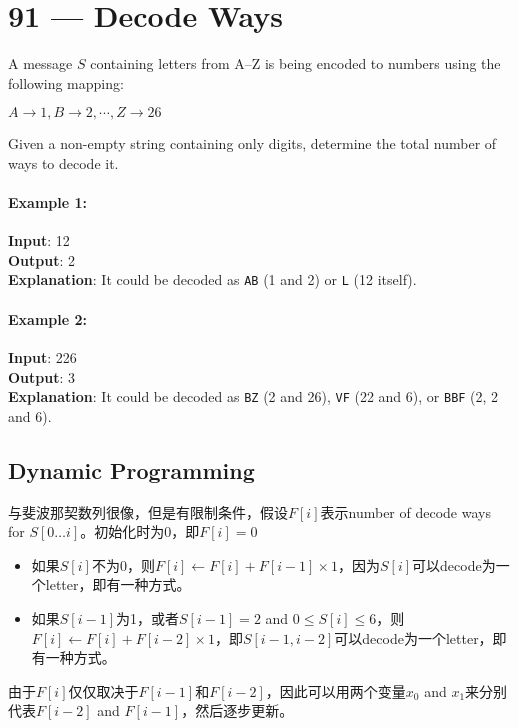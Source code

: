 \section{91 --- Decode Ways}
A message $S$ containing letters from A--Z is being encoded to numbers using the following mapping:
\par
$A\to 1, B\to 2, \cdots, Z\to 26$
\par
Given a non-empty string containing only digits, determine the total number of ways to decode it.
\paragraph{Example 1:}
\begin{flushleft}
\textbf{Input}: 12
\\
\textbf{Output}: 2
\\
\textbf{Explanation}: It could be decoded as \texttt{AB} (1 and 2) or \texttt{L} (12 itself).
\end{flushleft}
\paragraph{Example 2:}
\begin{flushleft}
\textbf{Input}: 226
\\
\textbf{Output}: 3
\\
\textbf{Explanation}: It could be decoded as \texttt{BZ} (2 and 26), \texttt{VF} (22 and 6), or \texttt{BBF} (2, 2 and 6).
\end{flushleft}
\subsection{Dynamic Programming}
与斐波那契数列很像，但是有限制条件，假设$F[i]$表示number of decode ways for $S[0\ldots i]$。初始化时为0，即$F[i] = 0$
\begin{itemize}
\item 如果$S[i]$不为0，则$F[i] \gets F[i] + F[i-1]\times 1$，因为$S[i]$可以decode为一个letter，即有一种方式。
\item 如果$S[i-1]$为1，或者$S[i-1]=2$ and $0\leq S[i]\leq 6$，则$F[i] \gets F[i] + F[i-2]\times 1$，即$S[i-1,i-2]$可以decode为一个letter，即有一种方式。
\end{itemize}
由于$F[i]$仅仅取决于$F[i-1]$和$F[i-2]$，因此可以用两个变量$x_0$ and $x_1$来分别代表$F[i-2]$ and $F[i-1]$，然后逐步更新。

